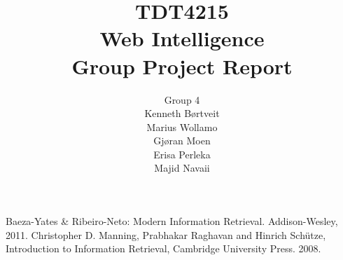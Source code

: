 \documentclass[a4paper, 11pt]{report}
\title{TDT4215 \\ Web Intelligence \\ Group Project Report}
\author{\Huge{Group 4} \vspace{2mm} \\ Kenneth Børtveit \\ Marius Wollamo \\ Gjøran Moen \\ Erisa Perleka \\ Majid Navaii}
\begin{document}
\maketitle
\tableofcontents
\listoffigures









\begin{thebibliography}{10}
Baeza-Yates \& Ribeiro-Neto: Modern Information Retrieval. Addison-Wesley, 2011.
Christopher D. Manning, Prabhakar Raghavan and Hinrich Schütze, Introduction to Information Retrieval, Cambridge University Press. 2008.
\end{thebibliography}
\end{document}
